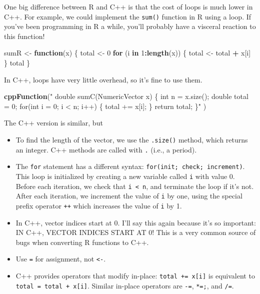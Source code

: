 \documentclass[]{krantz}
\makeatletter
\newenvironment{Shaded}{\begin{snugshade}}{\end{snugshade}}
\newcommand{\KeywordTok}[1]{\textcolor[rgb]{0.27,0.27,0.27}{\textbf{#1}}}
\newcommand{\DecValTok}[1]{\textcolor[rgb]{0.06,0.06,0.06}{#1}}
\newcommand{\StringTok}[1]{\textcolor[rgb]{0.5,0.5,0.5}{#1}}
\newcommand{\ControlFlowTok}[1]{\textcolor[rgb]{0.27,0.27,0.27}{\textbf{#1}}}
\newcommand{\OperatorTok}[1]{\textcolor[rgb]{0.43,0.43,0.43}{\textbf{#1}}}
\newcommand{\NormalTok}[1]{#1}
\newenvironment{kframe}{%
\medskip{}
\setlength{\fboxsep}{.8em}
 \def\at@end@of@kframe{}%
 \ifinner\ifhmode%
  \def\at@end@of@kframe{\end{minipage}}%
  \begin{minipage}{\columnwidth}%
 \fi\fi%
 \def\FrameCommand##1{\hskip\@totalleftmargin \hskip-\fboxsep
 \colorbox{shadecolor}{##1}\hskip-\fboxsep
     \hskip-\linewidth \hskip-\@totalleftmargin \hskip\columnwidth}%
 \MakeFramed {\advance\hsize-\width
   \@totalleftmargin\z@ \linewidth\hsize
   \@setminipage}}%
 {\par\unskip\endMakeFramed%
 \at@end@of@kframe}
\renewenvironment{Shaded}{\begin{kframe}}{\end{kframe}}
\makeatother
\begin{document}
One big difference between R and C++ is that the cost of loops is much
lower in C++. For example, we could implement the \texttt{sum()}
function in R using a loop. If you've been programming in R a while,
you'll probably have a visceral reaction to this function!

\begin{Shaded}
\begin{Highlighting}[]
\NormalTok{sumR <-}\StringTok{ }\ControlFlowTok{function}\NormalTok{(x) \{}
\NormalTok{    total <-}\StringTok{ }\DecValTok{0}
    \ControlFlowTok{for}\NormalTok{ (i }\ControlFlowTok{in} \DecValTok{1}\OperatorTok{:}\KeywordTok{length}\NormalTok{(x)) \{}
\NormalTok{        total <-}\StringTok{ }\NormalTok{total }\OperatorTok{+}\StringTok{ }\NormalTok{x[i]}
\NormalTok{    \}}
\NormalTok{    total}
\NormalTok{\}}
\end{Highlighting}
\end{Shaded}

In C++, loops have very little overhead, so it's fine to use them.

\begin{Shaded}
\begin{Highlighting}[]
\KeywordTok{cppFunction}\NormalTok{(}\StringTok{"}
\StringTok{  double sumC(NumericVector x) \{}
\StringTok{    int n = x.size();}
\StringTok{    double total = 0;}
\StringTok{    for(int i = 0; i < n; i++) \{}
\StringTok{      total += x[i];}
\StringTok{    \}}
\StringTok{    return total;}
\StringTok{  \}"}
\NormalTok{)}
\end{Highlighting}
\end{Shaded}

The C++ version is similar, but

\begin{itemize}
\item
  To find the length of the vector, we use the \texttt{.size()} method,
  which returns an integer. C++ methods are called with \texttt{.}
  (i.e., a period).
\item
  The \texttt{for} statement has a different syntax:
  \texttt{for(init;\ check;\ increment)}. This loop is initialized by
  creating a new variable called \texttt{i} with value 0. Before each
  iteration, we check that \texttt{i\ \textless{}\ n}, and terminate the
  loop if it's not. After each iteration, we increment the value of
  \texttt{i} by one, using the special prefix operator \texttt{++} which
  increases the value of \texttt{i} by 1.
\item
  In C++, vector indices start at 0. I'll say this again because it's so
  important: IN C++, VECTOR INDICES START AT 0! This is a very common
  source of bugs when converting R functions to C++.
\item
  Use \texttt{=} for assignment, not \texttt{\textless{}-}.
\item
  C++ provides operators that modify in-place:
  \texttt{total\ +=\ x{[}i{]}} is equivalent to
  \texttt{total\ =\ total\ +\ x{[}i{]}}. Similar in-place operators are
  \texttt{-=}, \texttt{*=;}, and \texttt{/=}.
\end{itemize}
\end{document}
